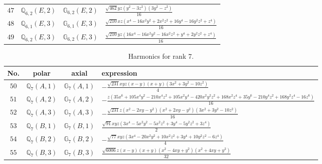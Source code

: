 \documentclass[fleqn,8pt,landscape]{jsarticle}
\begin{document}
\begin{table}[ht!]
\begin{center}
\begin{tabular}{cccl}
$ 47 $ & $ \mathbb{Q}_{6,2}(E,2) $ & $ \mathbb{G}_{6,2}(E,2) $ & $ \frac{\sqrt{462} y z \left(y^{2} - 3 z^{2}\right) \left(3 y^{2} - z^{2}\right)}{16} $ \\
$ 48 $ & $ \mathbb{Q}_{6,1}(E,3) $ & $ \mathbb{G}_{6,1}(E,3) $ & $ \frac{\sqrt{210} x z \left(x^{4} - 16 x^{2} y^{2} + 2 x^{2} z^{2} + 16 y^{4} - 16 y^{2} z^{2} + z^{4}\right)}{16} $ \\
$ 49 $ & $ \mathbb{Q}_{6,2}(E,3) $ & $ \mathbb{G}_{6,2}(E,3) $ & $ \frac{\sqrt{210} y z \left(16 x^{4} - 16 x^{2} y^{2} - 16 x^{2} z^{2} + y^{4} + 2 y^{2} z^{2} + z^{4}\right)}{16} $ \\
 \hline \hline
\end{tabular}
\end{center}
\end{table}
\begin{table}[ht!]
\begin{center}
\caption{Harmonics for rank 7.}
\renewcommand{\arraystretch}{1.3}
\begin{tabular}{cccl} \hline \hline
No. & polar & axial & expression \\ \hline
$ 50 $ & $ \mathbb{Q}_{7}(A,1) $ & $ \mathbb{G}_{7}(A,1) $ & $ - \frac{\sqrt{231} x y z \left(x - y\right) \left(x + y\right) \left(3 x^{2} + 3 y^{2} - 10 z^{2}\right)}{4} $ \\
$ 51 $ & $ \mathbb{Q}_{7}(A,2) $ & $ \mathbb{G}_{7}(A,2) $ & $ - \frac{z \left(35 x^{6} + 105 x^{4} y^{2} - 210 x^{4} z^{2} + 105 x^{2} y^{4} - 420 x^{2} y^{2} z^{2} + 168 x^{2} z^{4} + 35 y^{6} - 210 y^{4} z^{2} + 168 y^{2} z^{4} - 16 z^{6}\right)}{16} $ \\
$ 52 $ & $ \mathbb{Q}_{7}(A,3) $ & $ \mathbb{G}_{7}(A,3) $ & $ - \frac{\sqrt{231} z \left(x^{2} - 2 x y - y^{2}\right) \left(x^{2} + 2 x y - y^{2}\right) \left(3 x^{2} + 3 y^{2} - 10 z^{2}\right)}{16} $ \\
$ 53 $ & $ \mathbb{Q}_{7}(B,1) $ & $ \mathbb{G}_{7}(B,1) $ & $ \frac{\sqrt{91} x y z \left(3 x^{4} - 5 x^{2} y^{2} - 5 x^{2} z^{2} + 3 y^{4} - 5 y^{2} z^{2} + 3 z^{4}\right)}{2} $ \\
$ 54 $ & $ \mathbb{Q}_{7}(B,2) $ & $ \mathbb{G}_{7}(B,2) $ & $ - \frac{\sqrt{77} x y z \left(3 x^{4} - 20 x^{2} y^{2} + 10 x^{2} z^{2} + 3 y^{4} + 10 y^{2} z^{2} - 6 z^{4}\right)}{4} $ \\
$ 55 $ & $ \mathbb{Q}_{7}(B,3) $ & $ \mathbb{G}_{7}(B,3) $ & $ \frac{\sqrt{6006} z \left(x - y\right) \left(x + y\right) \left(x^{2} - 4 x y + y^{2}\right) \left(x^{2} + 4 x y + y^{2}\right)}{32} $ \\

\end{tabular}
\end{center}
\end{table}
\end{document}
